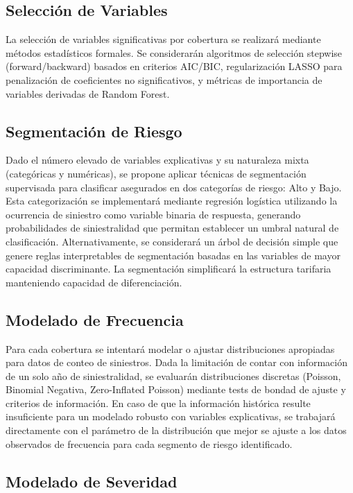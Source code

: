 \documentclass{article}
\begin{document}
\subsection{Selección de Variables}

La selección de variables significativas por cobertura se realizará mediante métodos estadísticos formales. Se considerarán algoritmos de selección stepwise (forward/backward) basados en criterios AIC/BIC, regularización LASSO para penalización de coeficientes no significativos, y métricas de importancia de variables derivadas de Random Forest.

\subsection{Segmentación de Riesgo}

Dado el número elevado de variables explicativas y su naturaleza mixta (categóricas y numéricas), se propone aplicar técnicas de segmentación supervisada para clasificar asegurados en dos categorías de riesgo: Alto y Bajo. Esta categorización se implementará mediante regresión logística utilizando la ocurrencia de siniestro como variable binaria de respuesta, generando probabilidades de siniestralidad que permitan establecer un umbral natural de clasificación. Alternativamente, se considerará un árbol de decisión simple que genere reglas interpretables de segmentación basadas en las variables de mayor capacidad discriminante. La segmentación simplificará la estructura tarifaria manteniendo capacidad de diferenciación.

\subsection{Modelado de Frecuencia}

Para cada cobertura se intentará modelar o ajustar distribuciones apropiadas para datos de conteo de siniestros. Dada la limitación de contar con información de un solo año de siniestralidad, se evaluarán distribuciones discretas (Poisson, Binomial Negativa, Zero-Inflated Poisson) mediante tests de bondad de ajuste y criterios de información. En caso de que la información histórica resulte insuficiente para un modelado robusto con variables explicativas, se trabajará directamente con el parámetro de la distribución que mejor se ajuste a los datos observados de frecuencia para cada segmento de riesgo identificado.

\subsection{Modelado de Severidad}
\end{document}

